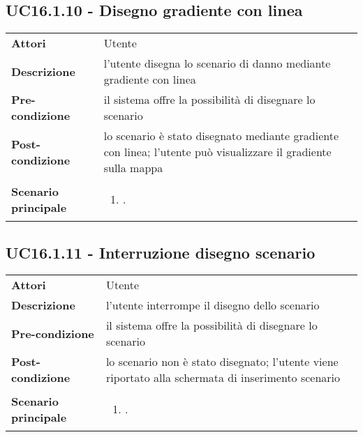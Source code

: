 \subsection{UC16.1.10 - Disegno gradiente con linea} 
\label{sssec:UC16.1.10} 
\def\arraystretch{1.5}
\begin{tabularx}{\textwidth}{l|p{}}
	\rowcolor{I} \multicolumn{2}{c}{\color{white}\textbf{UC16.1.10 - Disegno gradiente con linea}} \\
	\toprule
	\endhead
	\textbf{Attori} & Utente\\
	\textbf{Descrizione} & l'utente disegna lo scenario di danno mediante gradiente con linea\\
	\textbf{Pre-condizione} & il sistema offre la possibilità di disegnare lo scenario\\
	\textbf{Post-condizione} & lo scenario è stato disegnato mediante gradiente con linea; l'utente può visualizzare il gradiente sulla mappa\\
	\textbf{Scenario principale} & \vspace{-1.2em}\begin{enumerate}[leftmargin=*,noitemsep,nosep]
		\item \nameref{sssec:UC16.1.10}.
	\end{enumerate}\\
	\bottomrule
\end{tabularx}
\subsection{UC16.1.11 - Interruzione disegno scenario} 
\label{sssec:UC16.1.11} 
\def\arraystretch{1.5}
\begin{tabularx}{\textwidth}{l|p{}}
	\rowcolor{I} \multicolumn{2}{c}{\color{white}\textbf{UC16.1.11 - Interruzione disegno scenario}} \\
	\toprule
	\endhead
	\textbf{Attori} & Utente\\
	\textbf{Descrizione} & l'utente interrompe il disegno dello scenario\\
	\textbf{Pre-condizione} & il sistema offre la possibilità di disegnare lo scenario\\
	\textbf{Post-condizione} & lo scenario non è stato disegnato; l'utente viene riportato alla schermata di inserimento scenario\\
	\textbf{Scenario principale} & \vspace{-1.2em}\begin{enumerate}[leftmargin=*,noitemsep,nosep]
		\item \nameref{sssec:UC16.1.11}.
	\end{enumerate}\\
	\bottomrule
\end{tabularx}
